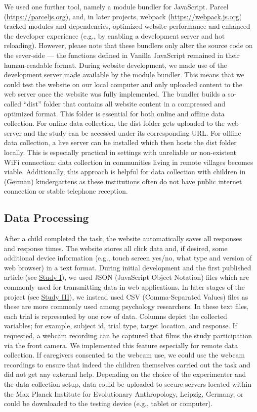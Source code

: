 \documentclass[
]{scrbook}
\begin{document}
We used one further tool, namely a module bundler for JavaScript. Parcel (\mbox{\url{https://parceljs.org}}), and, in later projects, webpack (\mbox{\url{https://webpack.js.org}}) tracked modules and dependencies, optimized website performance and enhanced the developer experience (e.g., by enabling a development server and hot reloading). However, please note that these bundlers only alter the source code on the sever-side --- the functions defined in Vanilla JavaScript remained in their human-readable format. During website development, we made use of the development server made available by the module bundler. This means that we could test the website on our local computer and only uploaded content to the web server once the website was fully implemented. The bundler builds a so-called ``dist'' folder that contains all website content in a compressed and optimized format. This folder is essential for both online and offline data collection. For online data collection, the dist folder gets uploaded to the web server and the study can be accessed under its corresponding URL. For offline data collection, a live server can be installed which then hosts the dist folder locally. This is especially practical in settings with unreliable or non-existent WiFi connection: data collection in communities living in remote villages becomes viable. Additionally, this approach is helpful for data collection with children in (German) kindergartens as these institutions often do not have public internet connection or stable telephone reception.

\subsection{Data Processing}\label{dataprocessing}

After a child completed the task, the website automatically saves all responses and response times. The website stores all click data and, if desired, some additional device information (e.g., touch screen yes/no, what type and version of web browser) in a text format. During initial development and the first published article (see \hyperref[studyI]{Study I}), we used JSON (JavaScript Object Notation) files which are commonly used for transmitting data in web applications. In later stages of the project (see \hyperref[studyIII]{Study III}), we instead used CSV (Comma-Separated Values) files as these are more commonly used among psychology researchers. In these text files, each trial is represented by one row of data. Columns depict the collected variables; for example, subject id, trial type, target location, and response. If requested, a webcam recording can be captured that films the study participation via the front camera. We implemented this feature especially for remote data collection. If caregivers consented to the webcam use, we could use the webcam recordings to ensure that indeed the children themselves carried out the task and did not get any external help. Depending on the choice of the experimenter and the data collection setup, data could be uploaded to secure servers located within the Max Planck Institute for Evolutionary Anthropology, Leipzig, Germany, or could be downloaded to the testing device (e.g., tablet or computer).
\end{document}
